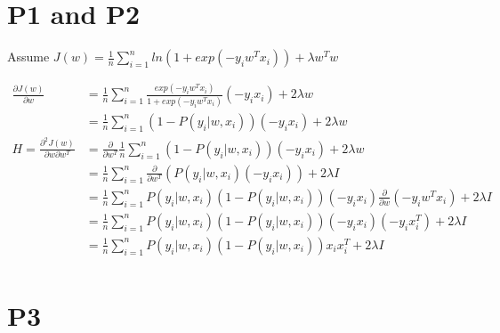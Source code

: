 \documentclass{article}
\newcommand{\s}{\sum\limits_{i=1}^{n}}
\newcommand{\p}[2]{\frac{\partial #1}{\partial #2}}
\newcommand{\pp}[3]{\frac{{\partial}^2 #1}{\partial #2 \partial #3}}
\begin{document}
\section{P1 and P2}

Assume $J(w) = \frac{1}{n} \s ln(1+exp(-y_i w^T x_i)) + \lambda w^Tw$

\newcommand{\e}{exp(-y_i w^T x_i)}
\newcommand{\ee}{exp(-2y_i w^T x_i)}

$
\begin{aligned}
  \p{J(w)}{w}         &= \frac{1}{n} \s \frac{\e}{1+\e} (-y_ix_i) + 2\lambda w \\
                      &= \frac{1}{n} \s (1-P(y_i|w,x_i))(-y_ix_i) + 2\lambda w \\
  H = \pp{J(w)}{w}{w^T} &= \p{}{w^T} \frac{1}{n} \s (1-P(y_i|w,x_i))(-y_ix_i) + 2\lambda w \\
                      &= \frac{1}{n} \s \p{}{w^T}(P(y_i|w,x_i)(-y_ix_i)) + 2\lambda I \\
                      &= \frac{1}{n} \s P(y_i|w,x_i)(1-P(y_i|w,x_i)) (-y_ix_i)\p{}{w}(-y_iw^Tx_i) + 2\lambda I \\
                      &= \frac{1}{n} \s P(y_i|w,x_i)(1-P(y_i|w,x_i)) (-y_ix_i)(-y_ix_i^T) + 2\lambda I \\
                      &= \frac{1}{n} \s P(y_i|w,x_i)(1-P(y_i|w,x_i)) x_ix_i^T + 2\lambda I \\
\end{aligned}
$

\section{P3}



\end{document}
